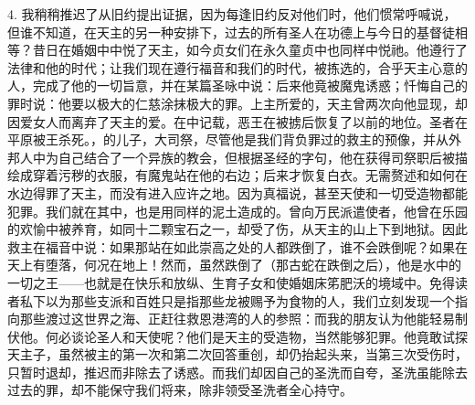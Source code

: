 4. 我稍稍推迟了从旧约提出证据，因为每逢旧约反对他们时，他们惯常呼喊说，但谁不知道，在天主的另一种安排下，过去的所有圣人在功德上与今日的基督徒相等？昔日在婚姻中中悦了天主，如今贞女们在永久童贞中也同样中悦祂。他遵行了法律和他的时代；让我们现在遵行福音和我们的时代，被拣选的，合乎天主心意的人，完成了他的一切旨意，并在某篇圣咏中说：后来他竟被魔鬼诱惑；忏悔自己的罪时说：他要以极大的仁慈涂抹极大的罪。上主所爱的，天主曾两次向他显现，却因爱女人而离弃了天主的爱。在中记载，恶王在被掳后恢复了以前的地位。圣者在平原被王杀死。，的儿子，大司祭，尽管他是我们背负罪过的救主的预像，并从外邦人中为自己结合了一个异族的教会，但根据圣经的字句，他在获得司祭职后被描绘成穿着污秽的衣服，有魔鬼站在他的右边；后来才恢复白衣。无需赘述和如何在水边得罪了天主，而没有进入应许之地。因为真福说，甚至天使和一切受造物都能犯罪。我们就在其中，也是用同样的泥土造成的。曾向万民派遣使者，他曾在乐园的欢愉中被养育，如同十二颗宝石之一，却受了伤，从天主的山上下到地狱。因此救主在福音中说：如果那站在如此崇高之处的人都跌倒了，谁不会跌倒呢？如果在天上有堕落，何况在地上！然而，虽然跌倒了（那古蛇在跌倒之后），他是水中的一切之王——也就是在快乐和放纵、生育子女和使婚姻床笫肥沃的境域中。免得读者私下以为那些支派和百姓只是指那些龙被赐予为食物的人，我们立刻发现一个指向那些渡过这世界之海、正赶往救恩港湾的人的参照：而我的朋友认为他能轻易制伏他。何必谈论圣人和天使呢？他们是天主的受造物，当然能够犯罪。他竟敢试探天主子，虽然被主的第一次和第二次回答重创，却仍抬起头来，当第三次受伤时，只暂时退却，推迟而非除去了诱惑。而我们却因自己的圣洗而自夸，圣洗虽能除去过去的罪，却不能保守我们将来，除非领受圣洗者全心持守。\par

